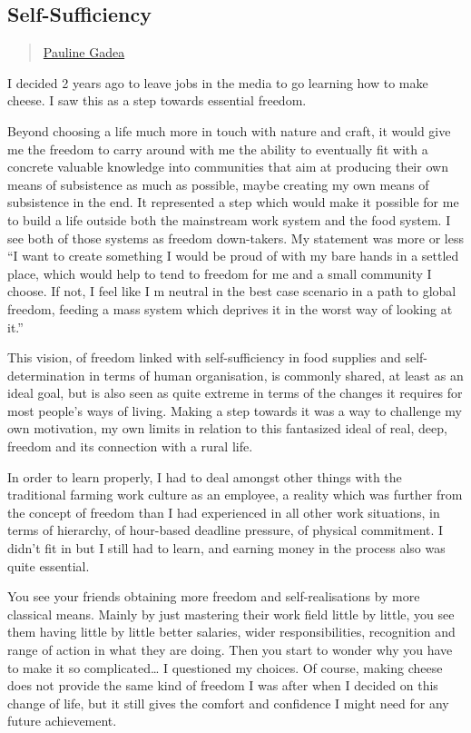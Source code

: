 \subsection{Self-Sufficiency}\label{self-sufficiency}

\begin{quote}
\href{../appendix/attributions.html\#pauline-gadea}{Pauline Gadea}
\end{quote}

I decided 2 years ago to leave jobs in the media to go learning how to
make cheese. I saw this as a step towards essential freedom.

Beyond choosing a life much more in touch with nature and craft, it
would give me the freedom to carry around with me the ability to
eventually fit with a concrete valuable knowledge into communities that
aim at producing their own means of subsistence as much as possible,
maybe creating my own means of subsistence in the end. It represented a
step which would make it possible for me to build a life outside both
the mainstream work system and the food system. I see both of those
systems as freedom down-takers. My statement was more or less ``I want
to create something I would be proud of with my bare hands in a settled
place, which would help to tend to freedom for me and a small community
I choose. If not, I feel like I m neutral in the best case scenario in a
path to global freedom, feeding a mass system which deprives it in the
worst way of looking at it.''

This vision, of freedom linked with self-sufficiency in food supplies
and self-determination in terms of human organisation, is commonly
shared, at least as an ideal goal, but is also seen as quite extreme in
terms of the changes it requires for most people's ways of living.
Making a step towards it was a way to challenge my own motivation, my
own limits in relation to this fantasized ideal of real, deep, freedom
and its connection with a rural life.

In order to learn properly, I had to deal amongst other things with the
traditional farming work culture as an employee, a reality which was
further from the concept of freedom than I had experienced in all other
work situations, in terms of hierarchy, of hour-based deadline pressure,
of physical commitment. I didn't fit in but I still had to learn, and
earning money in the process also was quite essential.

You see your friends obtaining more freedom and self-realisations by
more classical means. Mainly by just mastering their work field little
by little, you see them having little by little better salaries, wider
responsibilities, recognition and range of action in what they are
doing. Then you start to wonder why you have to make it so
complicated\ldots{} I questioned my choices. Of course, making cheese
does not provide the same kind of freedom I was after when I decided on
this change of life, but it still gives the comfort and confidence I
might need for any future achievement.

